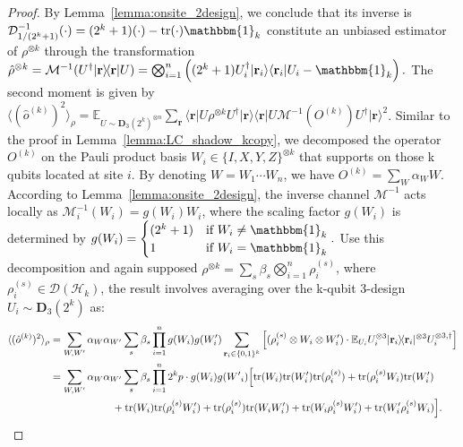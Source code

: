 \documentclass[aps,%
twocolumn,%
floatfix,%
pra,%
amsfonts,%
groupedaddress,%
superscriptaddress]{revtex4-2}%
\newcommand{\bra}[1]{\langle #1\rvert}
\newcommand{\ket}[1]{\lvert #1\rangle}
\newcommand{\1}{\mathbbm{1}}
\begin{document}
\begin{proof}
By Lemma~\ref{lemma:onsite_2design}, we conclude that its inverse is $\mathcal{D}_{1/(2^k + 1)}^{-1}(\cdot) = (2^k + 1)(\cdot) - \text{tr}(\cdot) \1_k $ constitute an unbiased estimator of $\rho^{\otimes k}$ through the transformation $\hat{\rho}^{\otimes k} =\mathcal{M}^{-1}(U^\dagger \ket{\mathbf r}\!\bra{\mathbf r} U)=\bigotimes_{i =1}^n\left((2^k + 1)U_i^{\dagger} \ket{\mathbf{r}_{i}}\bra{\mathbf{r}_{i}} U_i - \1_k\right).$
The second moment is given by $  \langle (\hat{o}^{(k)})^2 \rangle_{\rho} =\mathbb{E}_{U \sim \mathbf{D}_3(2^k)^{\otimes n}}\sum_{\mathbf r}\bra{\mathbf r}U \rho^{\otimes k} U^\dagger \ket{\mathbf{r}} \bra{\mathbf r}U\mathcal{M}^{-1}(O^{(k)}) U^\dagger\ket{\mathbf r}^2$.
    Similar to the proof in Lemma~\ref{lemma:LC_shadow_kcopy}, we decomposed the operator $O^{(k)}$ on the Pauli product basis $W_i \in \{I,X,Y,Z\}^{\otimes k}$ that supports on those k qubits located at site $i$. By denoting $W = W_1\cdots W_n$, we have $O^{(k)} = \sum_{W} \alpha_{W} W$. According to Lemma~\ref{lemma:onsite_2design}, the inverse channel $\mathcal{M}^{-1}$ acts locally as $\mathcal{M}_i^{-1}(W_i) = g(W_i) W_i$, where the scaling factor $g(W_i)$ is determined by $g(W_i) = \begin{cases} (2^k+1) & \text{if~} W_i \neq \1_k \\ 1 &\text{if~} W_i = \1_k \end{cases}.$
    Use this decomposition and again supposed $\rho^{\otimes k} = \sum_{s} \beta_s \bigotimes_{i=1}^n \rho_i^{(s)}$, where $ \rho_i^{(s)} \in \mathcal{D}(\mathcal{H}_k)$, the result involves averaging over the k-qubit 3-design $U_i \sim \mathbf{D}_3(2^k)$ as:
    \begin{align}
        \langle (\hat{o}^{(k)})^2 \rangle_{\rho} &= \sum_{W,W'}\alpha_{W}\alpha_{W'}\sum_{s}\beta_s\prod_{i = 1}^n g(W_i)g(W'_i)\sum_{\mathbf{r}_i \in \{0,1\}^k} \left[({\rho}^{(s)}_i \otimes W_i \otimes W'_i) \cdot \mathbb{E}_{U_i} U_i^{\otimes 3}\ket{\mathbf{r}_i}\!\bra{\mathbf{r}_i}^{\otimes 3}U_i^{\otimes 3,\dagger}\right] \\
        &= \sum_{W,W'}\alpha_{W}\alpha_{W'}\sum_s \beta_s\prod_{i = 1}^n 2^k p \cdot g(W_i)g({W'}_i) \Bigl[ \text{tr}(W_i)\text{tr}(W'_i)\text{tr}({\rho}^{(s)}_i) + \text{tr}({\rho}^{(s)}_i W_i)\text{tr}(W'_i) \notag\\
        & \qquad\qquad\qquad + \text{tr}(W_i)\text{tr}({\rho}^{(s)}_i W'_i)+\text{tr}({\rho}^{(s)}_i)\text{tr}(W_iW'_i) + \text{tr}(W_i {\rho}^{(s)}_i W'_i) + \text{tr}(W'_i {\rho}^{(s)}_i W_i) \Bigr]. \label{eq:mid_sqr_ave_2copy}
    \end{align}
    

\end{proof}
\end{document}
